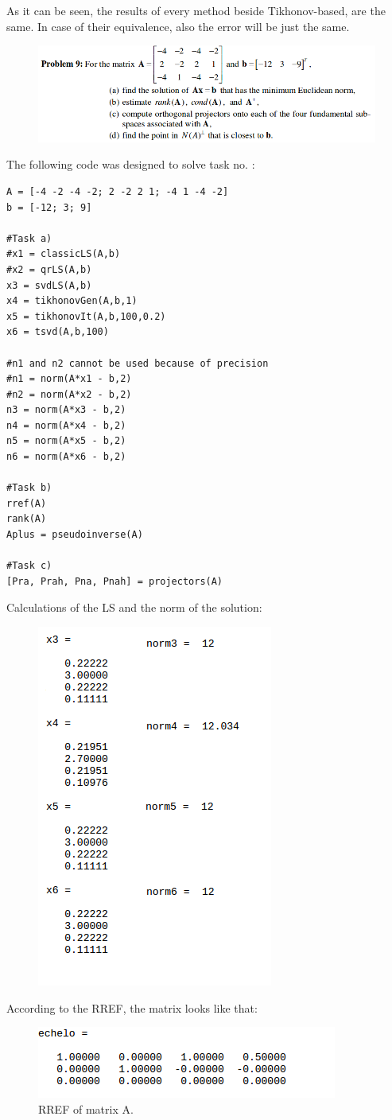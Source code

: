 \documentclass[eng,openany]{mgr}
\begin{document}
As it can be seen, the results of every method beside Tikhonov-based, are the same. In case of their equivalence, also the error will be just the same.
\newpage
\begin{figure}[h]
\centering
\includegraphics[width=0.7\linewidth]{screenshot025}
\label{fig:screenshot025}
\end{figure}
The following code was designed to solve task no. :
\begin{lstlisting}
A = [-4 -2 -4 -2; 2 -2 2 1; -4 1 -4 -2]
b = [-12; 3; 9]

#Task a)
#x1 = classicLS(A,b)
#x2 = qrLS(A,b)
x3 = svdLS(A,b)
x4 = tikhonovGen(A,b,1)
x5 = tikhonovIt(A,b,100,0.2)
x6 = tsvd(A,b,100)

#n1 and n2 cannot be used because of precision
#n1 = norm(A*x1 - b,2)
#n2 = norm(A*x2 - b,2)
n3 = norm(A*x3 - b,2)
n4 = norm(A*x4 - b,2)
n5 = norm(A*x5 - b,2)
n6 = norm(A*x6 - b,2)

#Task b)
rref(A)
rank(A)
Aplus = pseudoinverse(A)

#Task c)
[Pra, Prah, Pna, Pnah] = projectors(A)
\end{lstlisting}

Calculations of the LS and the norm of the solution:\begin{figure}[h]
\centering
\includegraphics[width=0.3\linewidth]{screenshot026}

\label{fig:screenshot026}
\end{figure}

According to the RREF, the matrix looks like that:
\begin{figure}[h]
\centering
\includegraphics[width=0.4\linewidth]{screenshot027}
\caption{RREF of matrix A.}
\label{fig:screenshot027}
\end{figure}
\end{document}
